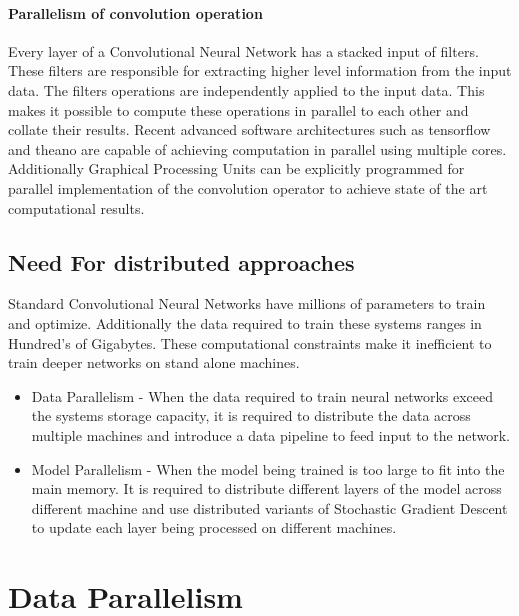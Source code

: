 \documentclass[sigconf]{acmart}
\begin{document}
\paragraph{\textbf{Parallelism of convolution operation}}

Every layer of a Convolutional Neural Network has a stacked input of filters. These filters are responsible for extracting higher level information from the input data. The filters operations are independently applied to the input data. This makes it possible to compute these operations in parallel to each other and collate their results\cite{NIPS2012-4824}. Recent advanced software architectures such as tensorflow and theano are capable of achieving computation in parallel using multiple cores. Additionally Graphical Processing Units can be explicitly programmed for parallel implementation of the convolution operator to achieve state of the art computational results.

\subsection{Need For distributed approaches}

Standard Convolutional Neural Networks have millions of parameters to train and optimize. Additionally the data required to train these systems ranges in Hundred's of Gigabytes. These computational constraints make it inefficient to train deeper networks on stand alone machines.

\begin{itemize}
\setlength\itemsep{1em}
\item Data Parallelism - When the data required to train neural networks exceed the systems storage capacity, it is required to distribute the data across multiple machines and introduce a data pipeline to feed input to the network\cite{Dean}.
\item Model Parallelism - When the model being trained is too large to fit into the main memory. It is required to distribute different layers of the model across different machine and use distributed variants of Stochastic Gradient Descent to update each layer being processed on different machines\cite{Googlenet}.  
\end{itemize}

\section{Data Parallelism} \label{data}
\end{document}
